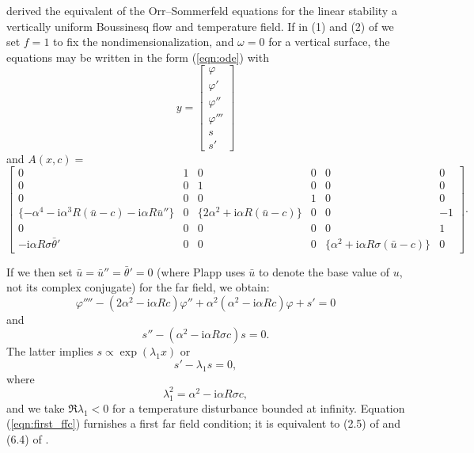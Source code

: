 \documentclass{article}
\begin{document}
\citet{Plapp57:JAeS-24-318} derived the equivalent of the
Orr--Sommerfeld equations for the linear stability a vertically
uniform Boussinesq flow and temperature field.  If in (1) and (2) of
\citet{Plapp57:JAeS-24-318} we set $f=1$ to fix the
nondimensionalization, and $\omega=0$ for a vertical surface, the
equations may be written in the form (\ref{eqn:ode}) with
\begin{equation}
y = \left[\begin{array}{c}
\varphi\\
\varphi'\\
\varphi''\\
\varphi'''\\
s \\
s'
      \end{array}
\right]
\end{equation}
and $A(x,c)=$
\begin{equation}
\left[\begin{array}{cccccc}
0 & 1 & 0 & 0 & 0 & 0 \\
0 & 0 & 1 & 0 & 0 & 0  \\
0 & 0 & 0 & 1 & 0 & 0  \\
\{-\alpha^4-\mathrm{i}\alpha^3 R (\bar{u}-c)-\mathrm{i}\alpha R\bar{u}''\} & 
        0 & 
  \{2\alpha^2+\mathrm{i}\alpha R(\bar{u}-c)\} & 0 & 0 & -1  \\
0 & 0 & 0 & 0 & 0 & 1  \\
-\mathrm{i}\alpha R \sigma \bar{\theta}' & 
        0 & 0 & 0 & \{\alpha^2+\mathrm{i}\alpha R\sigma (\bar{u}-c) \} & 0  
                 \end{array}\right].
\end{equation}


If we then set $\bar{u}=\bar{u}''=\bar{\theta}'=0$ (where Plapp uses
$\bar{u}$ to denote the base value of $u$, not its complex conjugate)
for the far field, we obtain:
\begin{equation}
\varphi'''' - (2\alpha^2-\mathrm{i}\alpha R c)\varphi'' 
+ \alpha^2(\alpha^2-\mathrm{i}\alpha R c)\varphi + s' = 0
\label{eqn:vorticity}
\end{equation}
and
\begin{equation}
s'' - (\alpha^2-\mathrm{i}\alpha R \sigma c) s = 0.
\label{eqn:temperature}
\end{equation}
The latter implies $s \propto \exp(\lambda_1 x)$ or
\begin{equation}
s' - \lambda_1 s = 0,
\label{eqn:first_ffc}
\end{equation}
where
\begin{equation}
\lambda_1^2 = \alpha^2-\mathrm{i}\alpha R \sigma c,
\label{eqn:lambda_1}
\end{equation}
and we take $\Re{\lambda_1} < 0$ for a temperature disturbance bounded
at infinity.  Equation (\ref{eqn:first_ffc}) furnishes a first far
field condition; it is equivalent to (2.5) of \citet{Gill69:JFM-35-775}
and (6.4) of \citet{Daniels97:JFM-335-57}.  
\end{document}
